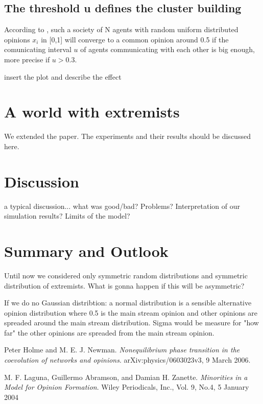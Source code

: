 \documentclass[11pt]{article}
\begin{document}
\subsection{The threshold u defines the cluster building}
According to \cite{Minor}, such a society of N agents with random uniform distributed opinions $x_i$ in [0,1] will converge to a common opinion around 0.5 if the comunicating interval $u$ of agents communicating with each other is big enough, more precise if $u>0.3$.

insert the plot and describe the effect

\section{A world with extremists}
We extended the paper. The experiments and their results should be discussed here.


\section{Discussion}
a typical discussion... what was good/bad? Problems? Interpretation of our simulation results? Limits of the model?

\section{Summary and Outlook}
Until now we considered only symmetric random distributions and symmetric distribution of extremists. What is gonna happen if this will be asymmetric?


If we do no Gaussian distribtion: a normal distribution is a sensible alternative opinion distribution where 0.5 is the main stream opinion and other opinions are spreaded around the main stream distribution. Sigma would be measure for "how far" the other opinions are spreaded from the main stream opinion.


\begin{thebibliography}{99}
 Peter Holme and M. E. J. Newman. \textit{Nonequilibrium phase transition in the coevolution of networks and opinions}. arXiv:physics/0603023v3, 9 March 2006.

 M. F. Laguna, Guillermo Abramson, and Damian H. Zanette. \textit{Minorities in a Model for Opinion Formation}. Wiley Periodicals, Inc., Vol. 9, No.4, 5 January 2004

\end{thebibliography} 
\end{document}

